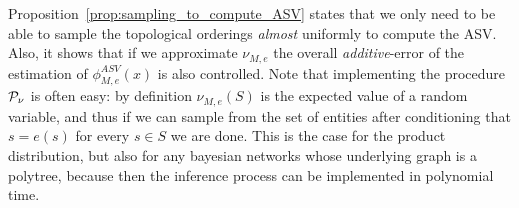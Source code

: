 Proposition~\ref{prop:sampling_to_compute_ASV} states that we only need to be able to sample the topological orderings \textit{almost} uniformly to compute the ASV. Also, it shows that if we approximate $\nu_{M,e}$ the overall \textit{additive}-error of the estimation
of $\phi^{ASV}_{M,e}(x)$ is also controlled. Note that implementing the procedure $\mathcal{P}_{\nu}$ is often easy: by definition $\nu_{M,e}(S)$ is the expected value of a random variable, and thus if we can sample from the set of entities after conditioning that $s = e(s)$ for every $s \in S$ we are done. This is the case for the product distribution, but also for any bayesian networks whose underlying graph is a polytree, because then the inference process can be implemented in polynomial time. 

